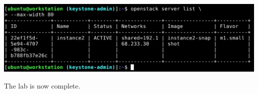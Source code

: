 \documentclass[letterpaper, 12pt]{article}
\begin{document}
\begin{enumerate}
\begin{labstep}
        \begin{center}
            \includegraphics[width=\linewidth]{images/part4/step20.png}
        \end{center}
    \end{labstep}

    \begin{labstep}
        The lab is now complete.
    \end{labstep}

\end{enumerate}
\end{document}
